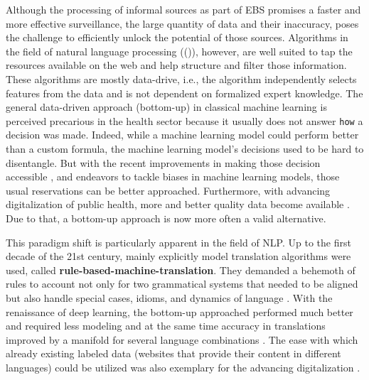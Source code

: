 Although the processing of informal sources as part of EBS promises a faster and more effective surveillance, the large quantity of data and their inaccuracy, poses the challenge to efficiently unlock the potential of those sources.
Algorithms in the field of natural language processing (()), however, are well suited to tap the resources available on the web and help structure and filter those information.
These algorithms are mostly data-drive, i.e., the algorithm independently selects features from the data and is not dependent on formalized expert knowledge.
The general data-driven approach (bottom-up) in classical machine learning is perceived precarious in the health sector because it usually does not answer \texttt{how} a decision was made.
Indeed, while a machine learning model could perform better than a custom formula, the machine learning model's decisions used to be hard to disentangle.
But with the recent improvements in making those decision accessible \citep{Arras2017}, and endeavors to tackle biases in machine learning models, those usual reservations can be better approached.
Furthermore, with advancing digitalization of public health, more and better quality data become available \citep{DEMIS}.
Due to that, a bottom-up approach is now more often a valid alternative.

This paradigm shift is particularly apparent in the field of NLP.
Up to the first decade of the 21st century, mainly explicitly model translation algorithms were used, called \textbf{rule-based-machine-translation}.
They demanded a behemoth of rules to account not only for two grammatical systems that needed to be aligned but also handle special cases, idioms, and dynamics of language \citep{Bar-Hillel1953, Bar-Hillel1960}.
With the renaissance of deep learning, the bottom-up approached performed much better and required less modeling and at the same time accuracy in translations improved by a manifold for several language combinations \citep{Bengio2003}.
The ease with which already existing labeled data (websites that provide their content in different languages) could be utilized was also exemplary for the advancing digitalization \citep{Macklovitch00}.

